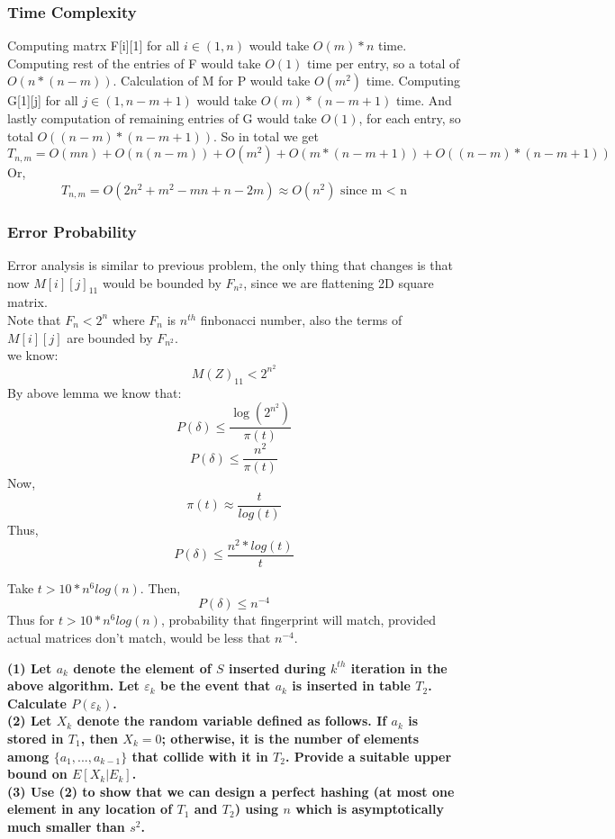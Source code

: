 \documentclass[a4paper]{article}
\begin{document}
\subsubsection*{Time Complexity}
Computing matrx F[i][1] for all $i \in (1, n)$ would take $O(m) * n$ time. Computing rest of the entries of F would take $O(1)$ time per entry, so a total of $O(n*(n-m))$. Calculation of M for P would take $O(m^2)$ time. Computing G[1][j] for all $j\in (1,n-m+1)$ would take $O(m) * (n-m+1)$ time. And lastly computation of remaining entries of G would take $O(1)$, for each entry, so total $O((n-m)*(n -m + 1))$. So in total we get 
$$T_{n,m} = O(mn) + O(n(n - m)) + O(m^2) + O(m*(n - m + 1)) + O((n-m)*(n-m+1))$$
Or, $$T_{n,m} = O(2n^2 + m^2 - mn + n - 2m) \approx O(n^2) \text{ since m < n}$$


\subsubsection*{Error Probability}
Error analysis is similar to previous problem, the only thing that changes is that now $M[i][j]_{11}$ would be bounded by $F_{n^2}$, since we are flattening 2D square matrix.\\
Note that $F_n < 2^n$ where $F_n$ is $n^{th}$ finbonacci number, also the terms of $M[i][j]$ are bounded by $F_{n^2}$.\\
we know: $$M(Z)_{11} < 2^{n^2}$$
By above lemma we know that: $$P(\delta) \leq \dfrac{\log (2^{n^2})}{\pi(t)}$$
$$P(\delta) \leq \frac{n^2}{\pi(t)}$$
Now,
$$\pi(t) \approx \frac{t}{log(t)}$$
Thus, $$P(\delta) \leq \frac{n^2*log(t)}{t}$$

Take $t > 10*n^6log(n)$. Then, $$P(\delta) \leq n^{-4}$$
Thus for $t > 10*n^6log(n)$, probability that fingerprint will match, provided actual matrices don't match, would be less that $n^{-4}$.

\pagebreak
\begin{question}[]
\textbf{(1) Let $a_k$ denote the element of $S$ inserted during $k^{th}$ iteration in the above algorithm.
Let $\varepsilon_k$ be the event that $a_k$ is inserted in table $T_2$. Calculate $P(\varepsilon_k)$.\\
(2) Let $X_k$ denote the random variable defined as follows. If $a_k$ is stored in $T_1$, then
$X_k = 0$; otherwise, it is the number of elements among $\{a_1, . . . , a_{k-1}\}$ that collide with it in $T_2$.
Provide a suitable upper bound on $E[X_k | E_k]$.\\
(3)  Use (2) to show that we can design a perfect hashing (at most one element in any
location of $T_1$ and $T_2$) using $n$ which is asymptotically much smaller than $s^2$.}
\end{question}
\end{document}
